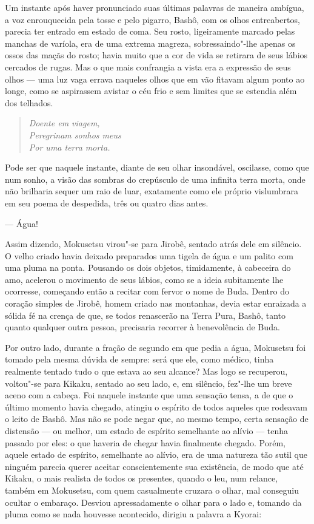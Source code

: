 Um instante após haver pronunciado suas últimas palavras de maneira
ambígua, a voz enrouquecida pela tosse e pelo pigarro, Bashô, com os
olhos entreabertos, parecia ter entrado em estado de coma. Seu rosto,
ligeiramente marcado pelas manchas de varíola, era de uma extrema
magreza, sobressaindo"-lhe apenas os ossos das maçãs do rosto; havia
muito que a cor de vida se retirara de seus lábios cercados de rugas.
Mas o que mais confrangia a vista era a expressão de seus olhos --- uma
luz vaga errava naqueles olhos que em vão fitavam algum ponto ao longe,
como se aspirassem avistar o céu frio e sem limites que se estendia
além dos telhados.

\begin{verse}
\textit{Doente em viagem,\\
Peregrinam sonhos meus\\
Por uma terra morta.}
\end{verse}

Pode ser que naquele instante, diante de seu olhar insondável,
oscilasse, como que num sonho, a visão das sombras do crepúsculo de uma
infinita terra morta, onde não brilharia sequer um raio de luar,
exatamente como ele próprio vislumbrara em seu poema de despedida, três
ou quatro dias antes.

--- Água!

Assim dizendo, Mokusetsu virou"-se para Jirobê, sentado atrás dele em
silêncio. O velho criado havia deixado preparados uma tigela de água e
um palito com uma pluma na ponta. Pousando os dois objetos,
timidamente, à cabeceira do amo, acelerou o movimento de seus lábios,
como se a ideia subitamente lhe ocorresse, começando então a recitar
com fervor o nome de Buda. Dentro do coração simples de Jirobê, homem
criado nas montanhas, devia estar enraizada a sólida fé na crença de
que, se todos renascerão na Terra Pura, Bashô, tanto quanto qualquer
outra pessoa, precisaria recorrer à benevolência de Buda.

Por outro lado, durante a fração de segundo em que pedia a água,
Mokusetsu foi tomado pela mesma dúvida de sempre: será que ele, como
médico, tinha realmente tentado tudo o que estava ao seu alcance? Mas
logo se recuperou, voltou"-se para Kikaku, sentado ao seu lado, e, em
silêncio, fez"-lhe um breve aceno com a cabeça. Foi naquele instante que
uma sensação tensa, a de que o último momento havia chegado, atingiu o
espírito de todos aqueles que rodeavam o leito de Bashô. Mas não se
pode negar que, ao mesmo tempo, certa sensação de distensão --- ou
melhor, um estado de espírito semelhante ao alívio --- tenha passado por
eles: o que haveria de chegar havia finalmente chegado. Porém, aquele
estado de espírito, semelhante ao alívio, era de uma natureza tão sutil
que ninguém parecia querer aceitar conscientemente sua existência, de
modo que até Kikaku, o mais realista de todos os presentes, quando o
leu, num relance, também em Mokusetsu, com quem casualmente cruzara o
olhar, mal conseguiu ocultar o embaraço. Desviou apressadamente o olhar
para o lado e, tomando da pluma como se nada houvesse acontecido,
dirigiu a palavra a Kyorai:

